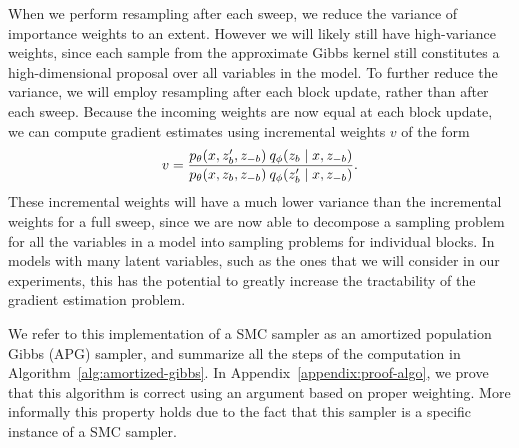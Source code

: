 \documentclass{article}
\theoremstyle{definition}
\begin{document}
When we perform resampling after each sweep, we reduce the variance of importance weights to an extent. However we will likely still have high-variance weights, since each sample from the approximate Gibbs kernel still constitutes a high-dimensional proposal over all variables in the model. To further reduce the variance, we will employ resampling after each block update, rather than after each sweep. Because the incoming weights are now equal at each block update, we can compute gradient estimates using incremental weights $v$ of the form
\begin{align}
    v
    = 
    \frac{p_\theta(x, z'_b, z_{-b}) \: q_\phi(z_b \mid  x, z_{-b})}
         {p_\theta(x, z_b, z_{-b}) \: q_\phi(z'_b \mid  x, z_{-b})}
    .
\end{align}
These incremental weights will have a much lower variance than the incremental weights for a full sweep, since we are now able to decompose a sampling problem for all the variables in a model into sampling problems for individual blocks. In models with many latent variables, such as the ones that we will consider in our experiments, this has the potential to greatly increase the tractability of the gradient estimation problem. 


We refer to this implementation of a SMC sampler as an amortized population Gibbs (APG) sampler, and summarize all the steps of the computation in Algorithm~\ref{alg:amortized-gibbs}. In Appendix~\ref{appendix:proof-algo}, we prove that this algorithm is correct using an argument based on proper weighting. More informally this property holds due to the fact that this sampler is a specific instance of a SMC sampler. 
\end{document}
